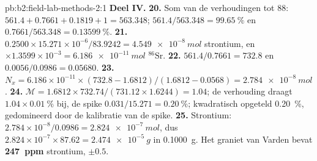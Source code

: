 \begin{solution}{pb:b2:field-lab-methods-2:1}
\noindent\textbf{Deel IV.}
\textbf{20.} Som van de verhoudingen tot 88: $561.4 + 0.7661 + 0.1819 + 1 = 563.348$; $561.4/563.348 =
\qty{99.65}{\percent}$ en $0.7661/563.348 = \qty{0.13599}{\percent}$.
\textbf{21.} $0.2500 \times 15.271 \times 10^{-6}/83.9242 = \qty{4.549e-8}{mol}$ strontium, en
$\times 1.3599 \times 10^{-3} = \qty{6.186e-11}{mol}$ $^{86}\mathrm{Sr}$.
\textbf{22.} $561.4/0.7661 = 732.8$ en $0.0056/0.0986 = 0.05680$.
\textbf{23.} $N_x = 6.186 \times 10^{-11} \times (732.8 - 1.6812)/(1.6812 - 0.0568) =
\qty{2.784e-8}{mol}$.
\textbf{24.} $\mathcal M = 1.6812 \times 732.74/(731.12 \times 1.6244) = 1.04$; de verhouding draagt
$1.04 \times \qty{0.01}{\percent}$ bij, de spike $0.031/15.271 = \qty{0.20}{\percent}$; kwadratisch opgeteld
\qty{0.20}{\percent}, gedomineerd door de kalibratie van de spike.
\textbf{25.} Strontium: $2.784 \times 10^{-8}/0.0986 = \qty{2.824e-7}{mol}$, dus $2.824 \times
10^{-7} \times 87.62 = \qty{2.474e-5}{g}$ in \qty{0.1000}{g}. Het graniet van Varden bevat
\textbf{\qty[text-series-to-math=true]{247}{ppm}} strontium, $\pm 0.5$.
\end{solution}
